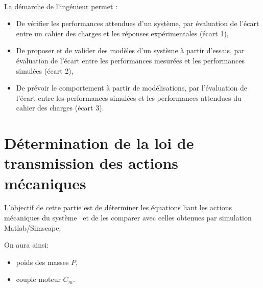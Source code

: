 

 \\

\graphicspath{{../../../img/}}
\begin{center}
\def\svgwidth{\columnwidth}

\end{center}

La démarche de l’ingénieur permet :
\begin{itemize}
 \item De vérifier les performances attendues d’un système, par évaluation de l’écart entre un cahier des charges et les réponses expérimentales (écart 1),
 \item De proposer et de valider des modèles d’un système à partir d’essais, par évaluation de l’écart entre les performances mesurées et les performances simulées (écart 2),
 \item De prévoir le comportement à partir de modélisations, par l’évaluation de l’écart entre les performances simulées et les performances attendues du cahier des charges (écart 3).
\end{itemize}


\newpage

\section{Détermination de la loi de transmission des actions mécaniques}

L'objectif de cette partie est de déterminer les équations liant les actions mécaniques du système \systemes\ et de les comparer avec celles obtenues par simulation Matlab/Simscape.

On aura ainsi:
\begin{itemize}
 \item poids des masses $P$,
 \item couple moteur $C_m$.
\end{itemize}

